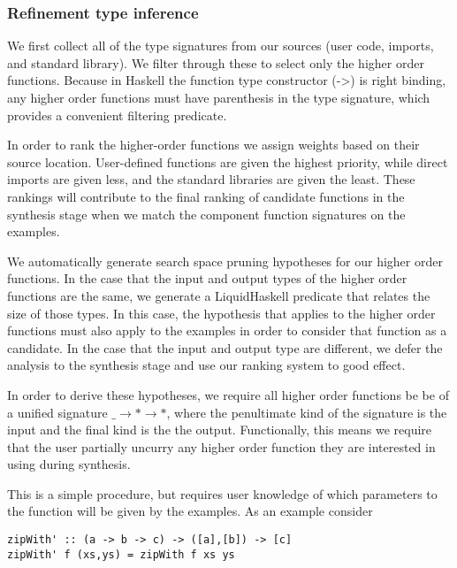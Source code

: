\subsubsection{Refinement type inference}

We first collect all of the type signatures from our sources (user code, imports, and standard library). We filter through these to select only the higher order functions. Because in Haskell the function type constructor (->) is right binding, any higher order functions must have parenthesis in the type signature, which provides a convenient filtering predicate.

In order to rank the higher-order functions we assign weights based on their source location. User-defined functions are given the highest priority, while direct imports are given less, and the standard libraries are given the least. These rankings will contribute to the final ranking of candidate functions in the synthesis stage when we match the component function signatures on the examples.


We automatically generate search space pruning hypotheses for our higher order functions.
In the case that the input and output types of the higher order functions are the same, we generate a LiquidHaskell predicate that relates the size of those types.
In this case, the hypothesis that applies to the higher order functions must also apply to the examples in order to consider that function as a candidate.
In the case that the input and output type are different, we defer the analysis to the synthesis stage and use our ranking system to good effect.

In order to derive these hypotheses, we require all higher order functions be be of a unified signature \texttt{$\_ \to * \to *$}, where the penultimate kind of the signature is the input and the final kind is the the output.  Functionally, this means we require that the user partially uncurry any higher order function they are interested in using during synthesis.

This is a simple procedure, but requires user knowledge of which parameters to the function will be given by the examples. 
As an example consider 

\begin{lstlisting}
zipWith' :: (a -> b -> c) -> ([a],[b]) -> [c]
zipWith' f (xs,ys) = zipWith f xs ys
\end{lstlisting}


